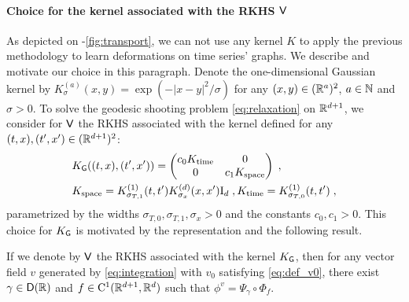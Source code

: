     \paragraph{Choice for the kernel associated with the RKHS $\mathsf{V}$}
    \label{paragraph:kernel_V}
    As depicted on -\ref{fig:transport}, we can not use any kernel $K$ to apply the previous methodology to learn deformations on time series' graphs.
    We describe and motivate our choice in this paragraph.
     Denote the one-dimensional Gaussian kernel by $K_\sigma^{(a)}(x,y)=\exp(-|x-y|^2/\sigma)$ for any $(x,y)\in (\mathbb{R}^a)^2$, $a\in \mathbb{N}$ and $\sigma>0$.
    To solve the geodesic shooting problem \eqref{eq:relaxation} on $\mathbb{R}^{d+1}$, we consider for $\mathsf{V}$ the RKHS associated with the kernel defined for any $(t,x),(t',x')\in (\mathbb{R}^{d+1})^2$:
    \begin{align}
      \label{eq:kernel_TAS}
      &K_{\mathsf{G}}((t,x),(t',x'))=\begin{pmatrix}
        c_0K_{\text{time}} & 0 \\
        0 & c_1 K_{\text{space}} 
        \end{pmatrix} \; ,\\
       & K_{\text{space}}=K_{\sigma_{T,1}}^{(1)}(t,t')K_{\sigma_x}^{(d)}(x,x') \mathrm{I}_d\;,K_{\text{time}}=K_{\sigma_{T,0}}^{(1)}(t,t') \;,
    \end{align}
    parametrized by the widths $\sigma_{T,0},\sigma_{T,1},\sigma_x>0$ and the constants $c_0,c_1>0$.
This choice for $K_{\mathsf{G}}$ is motivated by the representation  and the following result. 
    \begin{lemma}
      If we denote by $\mathsf{V}$ the RKHS associated with the kernel $K_{\mathsf{G}}$, then for any vector field $v$ generated by \eqref{eq:integration} with $v_0$ satisfying \eqref{eq:def_v0},
       there exist $\gamma \in \mathsf{D}(\mathbb{R}) $ and $f\in \mathrm{C}^1(\mathbb{R}^{d+1},\mathbb{R}^d)$ such that $\phi^v=\Psi_\gamma\circ\Phi_f $.
    \end{lemma}
